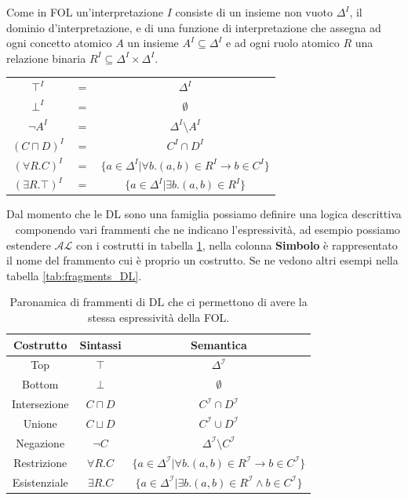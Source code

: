 \documentclass{article}
\begin{document}
Come in FOL un'interpretazione $I$ consiste di un insieme non vuoto $\Delta^{I}$, il dominio d'interpretazione, e di una funzione di interpretazione che assegna ad ogni concetto atomico $A$ un insieme $A^{I} \subseteq \Delta^{I}$ e ad ogni ruolo atomico $R$ una relazione binaria $R^{I} \subseteq \Delta^{I} \times \Delta^{I}$. 

\begin{table}[h!] 
    \centering
    \begin{tabular}{c c c}
        $ \top^{I} $ &  $ = $ &  $ \Delta^{I} $ \\
        $ \bot^{I} $ &  $ = $ & $ \emptyset $ \\
        $ \neg A^{I} $ & $ = $ & $ \Delta^{I} \setminus A^{I} $ \\
        $ (C \sqcap D)^{I} $ & $ = $ & $ C^{I} \cap D^{I} $ \\
        $ (\forall R.C)^{I} $ & $ = $ & 
            $\{ a \in \Delta^{I} | \forall b.(a,b) \in R^{I} \rightarrow b \in C^{I} \}$ \\
        $ (\exists R.\top)^{I}$ & $ = $ &
            $\{ a \in \Delta^{I} | \exists b.(a,b) \in R^{I} \}$ \\
    \end{tabular}
\end{table}

Dal momento che le DL sono una famiglia possiamo definire una logica descrittiva ~\cite[Appendix 1]{dl:handbook} componendo vari frammenti che ne indicano l'espressività, ad esempio possiamo estendere $ \mathcal{AL} $ con i costrutti in tabella \ref{tab:extend_DL}, nella colonna \textbf{Simbolo} è rappresentato il nome del frammento cui è proprio un costrutto. Se ne vedono altri esempi nella tabella \ref{tab:fragments_DL}.

\begin{table}[h!t] 
    \centering
    \label{tab:extend_DL}
    \caption{Paronamica di frammenti di DL che ci permettono di avere la stessa espressività della FOL.}
    \begin{tabular}{c c c}
        \textbf{Costrutto} & \textbf{Sintassi} & \textbf{Semantica} \\
        \hline
        Top & $\top$ & $\Delta^{\mathcal{I}}$ \\
        Bottom & $\bot$ & $\emptyset$ \\
        Intersezione & $C \sqcap D$ & $C^{\mathcal{I}} \cap D^{\mathcal{I}}$ \\
        Unione & $C \sqcup D$ & $C^{\mathcal{I}} \cup D^{\mathcal{I}}$ \\ 
        Negazione & $\neg C$ & $\Delta^{\mathcal{I}} \setminus C^{\mathcal{I}}$ \\
        Restrizione & $\forall R.C$ & 
        $\{ a \in \Delta^{\mathcal{I}} | \forall b.(a,b) \in R^{\mathcal{I}} \rightarrow b \in C^{\mathcal{I}} \}$ \\
        Esistenziale & $\exists R.C$ & 
        $\{ a \in \Delta^{\mathcal{I}} | \exists b.(a,b) \in R^{\mathcal{I}} \land b \in C^{\mathcal{I}} \}$ \\
        \hline
    \end{tabular}
\end{table}
\end{document}
